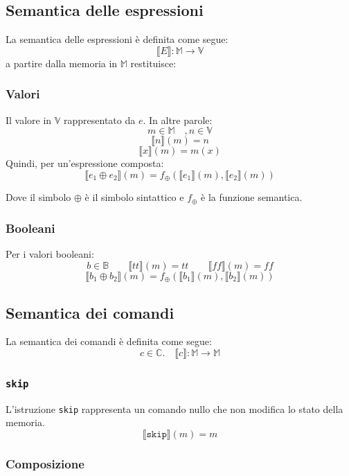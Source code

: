 \subsection{Semantica delle espressioni}

La semantica delle espressioni è definita come segue:
\[
\llbracket E \rrbracket : \mathbb{M} \rightarrow \mathbb{V}
\]
a partire dalla memoria in $\mathbb{M}$ restituisce:

\subsubsection{Valori}

Il valore in $\mathbb{V}$ rappresentato da $e$. In altre parole:
\[
m\in \mathbb{M}\quad, n \in \mathbb{V}
\]
\[
\llbracket n \rrbracket (m) = n
\]
\[
\llbracket x \rrbracket (m) = m(x)
\]
Quindi, per un'espressione composta:
\[
\llbracket e_1 \oplus e_2 \rrbracket (m) = f_{\oplus}(\llbracket e_1 \rrbracket (m), \llbracket e_2 \rrbracket (m) )
\]

Dove il simbolo $\oplus$ è il simbolo sintattico e $f_{\oplus}$ è la funzione semantica.

\subsubsection{Booleani}

Per i valori booleani:
\[
b \in \mathbb{B} \qquad \llbracket tt \rrbracket (m) = tt \qquad \llbracket ff \rrbracket( m )= ff
\]
\[
\llbracket b_1 \oplus b_2 \rrbracket (m) = f_{\oplus}(\llbracket b_1 \rrbracket (m), \llbracket b_2 \rrbracket (m) )  
\]

\subsection{Semantica dei comandi}

La semantica dei comandi è definita come segue:
\[
c \in \mathbb{C}. \quad \llbracket c \rrbracket : \mathbb{M} \rightarrow \mathbb{M}
\]

\subsubsection{\texttt{skip}}

L'istruzione \texttt{skip} rappresenta un comando nullo che non modifica lo stato della memoria.
\[
\llbracket \texttt{skip} \rrbracket (m) = m
\]

\subsubsection{Composizione}

